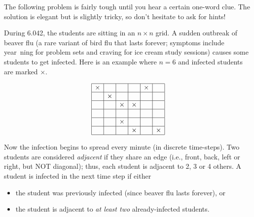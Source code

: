 \documentclass[twoside,12pt]{article}
\begin{document}
\begin{problem}{20}
The following problem is fairly tough until you hear a certain
one-word clue. The solution is elegant but is slightly tricky, so don't hesitate to ask for hints!

During 6.042, the students are sitting in
an $n\times n$ grid. A sudden outbreak of beaver flu (a rare variant of bird flu that lasts forever; symptoms include year\
ning for problem sets and craving for ice cream study sessions) causes some students to get infected. Here is
an example where $n = 6$ and infected students are marked $\times$.

\[
\begin{array}{|c|c|c|c|c|c|}
\hline
\times& & & &\times & \\ \hline
 &\times& & & & \\ \hline
& &\times&\times& & \\ \hline
& & & & & \\ \hline
& &\times& & & \\ \hline
& & &\times& &\times \\ \hline
\end{array}
\]

\noindent Now the infection begins to spread every minute (in discrete time-steps). Two students are considered \textit{adjacent} if they
share an edge (i.e., front, back, left or right, but NOT diagonal); thus, each student is adjacent to 2, 3 or 4 others.  A
student is infected in the next time step if either

\begin{itemize}
\item the student was previously infected (since beaver flu lasts forever), or
\item the student is adjacent to \textit{at least two} already-infected students.
\end{itemize}


\end{problem}
\end{document}

